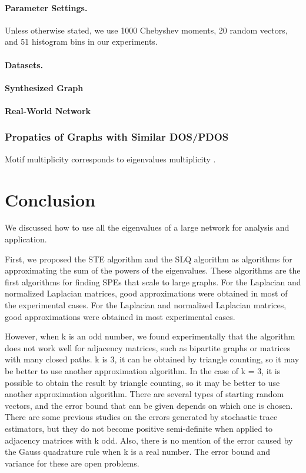 \documentclass[senior,final,11pt]{iscs-thesis}
\begin{document}
\subsubsection*{Parameter Settings.}
Unless otherwise stated, we use 1000 Chebyshev moments, 20 random vectors, and 51 histogram bins in our experiments.

\subsubsection*{Datasets.}


\subsubsection{Synthesized Graph}


\subsubsection{Real-World Network}

\subsection{Propaties of Graphs with Similar DOS/PDOS}
Motif multiplicity corresponds to eigenvalues multiplicity \cite{mehatari2015effect,dong2019network}.


\chapter{Conclusion}
We discussed how to use all the eigenvalues of a large network for analysis and application.

First, we proposed the STE algorithm and the SLQ algorithm as algorithms for approximating the sum of the powers of the eigenvalues. These algorithms are the first algorithms for finding SPEs that scale to large graphs. For the Laplacian and normalized Laplacian matrices, good approximations were obtained in most of the experimental cases. For the Laplacian and normalized Laplacian matrices, good approximations were obtained in most experimental cases.

However, when k is an odd number, we found experimentally that the algorithm does not work well for adjacency matrices, such as bipartite graphs or matrices with many closed paths. k is 3, it can be obtained by triangle counting, so it may be better to use another approximation algorithm. In the case of k = 3, it is possible to obtain the result by triangle counting, so it may be better to use another approximation algorithm. There are several types of starting random vectors, and the error bound that can be given depends on which one is chosen. There are some previous studies on the errors generated by stochastic trace estimators, but they do not become positive semi-definite when applied to adjacency matrices with k odd. Also, there is no mention of the error caused by the Gauss quadrature rule when k is a real number. The error bound and variance for these are open problems.
\end{document}
